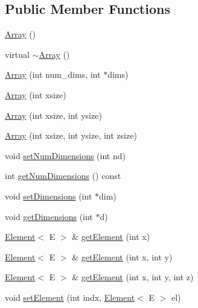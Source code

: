 \subsection*{Public Member Functions}
\begin{DoxyCompactItemize}
\item 
\mbox{\hyperlink{classbridges_1_1_array_a958421b86ff55303b5fc7d505109f9fe}{Array}} ()
\item 
virtual \mbox{\hyperlink{classbridges_1_1_array_aa80b2d2ebc4c27e74a8eaaeb6907b474}{$\sim$\+Array}} ()
\item 
\mbox{\hyperlink{classbridges_1_1_array_a25ff771f9ba7f365465f309ed2dd3688}{Array}} (int num\+\_\+dims, int $\ast$dims)
\item 
\mbox{\hyperlink{classbridges_1_1_array_a0a475058b73b938f0fd3f577365aca89}{Array}} (int xsize)
\item 
\mbox{\hyperlink{classbridges_1_1_array_a13b26fc4d2ccb19b277b2acc615efce2}{Array}} (int xsize, int ysize)
\item 
\mbox{\hyperlink{classbridges_1_1_array_a3504e71cacffd343edf8b9ea16f75eb4}{Array}} (int xsize, int ysize, int zsize)
\item 
void \mbox{\hyperlink{classbridges_1_1_array_a6b91612bb7b89a563571fd1ea417ef2a}{set\+Num\+Dimensions}} (int nd)
\item 
int \mbox{\hyperlink{classbridges_1_1_array_a31edfcff05dd4102fee1840ee915319e}{get\+Num\+Dimensions}} () const
\item 
void \mbox{\hyperlink{classbridges_1_1_array_a4e179915ab7820bbafe9b3433656b182}{set\+Dimensions}} (int $\ast$dim)
\item 
void \mbox{\hyperlink{classbridges_1_1_array_ae195a6f06157e82c68483ff636e30f5e}{get\+Dimensions}} (int $\ast$d)
\item 
\mbox{\hyperlink{classbridges_1_1_element}{Element}}$<$ E $>$ \& \mbox{\hyperlink{classbridges_1_1_array_a8b4c6cc491829d814e0b6b0ce3654417}{get\+Element}} (int x)
\item 
\mbox{\hyperlink{classbridges_1_1_element}{Element}}$<$ E $>$ \& \mbox{\hyperlink{classbridges_1_1_array_acd5e730e0369b1fa699a5907e889f213}{get\+Element}} (int x, int y)
\item 
\mbox{\hyperlink{classbridges_1_1_element}{Element}}$<$ E $>$ \& \mbox{\hyperlink{classbridges_1_1_array_a7006eeac547c391cb7e8eb19c56ae9f6}{get\+Element}} (int x, int y, int z)
\item 
void \mbox{\hyperlink{classbridges_1_1_array_aae8ec0bd850e00593487022bc914afe0}{set\+Element}} (int indx, \mbox{\hyperlink{classbridges_1_1_element}{Element}}$<$ E $>$ el)

\end{DoxyCompactItemize}
